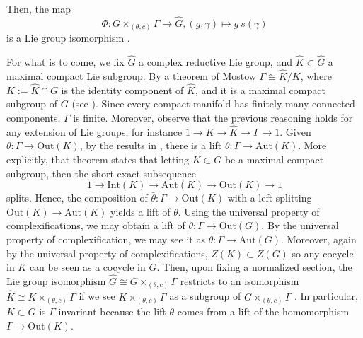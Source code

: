 Then, the map 
\begin{equation} \label{eq_def_isomorp}
\Phi\colon G \times_{(\theta, c)} \Gamma \longrightarrow \hat{G}, (g, \gamma) \mapsto g\ s(\gamma) 
\end{equation}
is a Lie group isomorphism \parencite[Remark 18.1.8]{hilgert2011structure}. 


For what is to come, we fix \(\hat{G}\) a complex reductive Lie group, and \(\hat{K} \subset \hat{G}\) a maximal compact Lie subgroup. By a theorem of Mostow \(\Gamma\cong\hat{K}/K\), where \(K:=\hat{K} \cap G\) is the identity component of \(\hat{K}\), and it is a maximal compact subgroup of \(G\) (see \parencite[Th. 3.1]{mostow1955self}). Since every compact manifold has finitely many connected components, \(\Gamma\) is finite. Moreover, observe that the previous reasoning holds for any extension of Lie groups, for instance \(1 \to K \to \hat{K}\to \Gamma \to 1\). Given \(\bar{\theta}\colon \Gamma \to \mathrm{Out}(K)\), by the results in \parencite[See Ch I, Sec 2]{de1956groupes}, there is a lift \(\theta\colon \Gamma \to \mathrm{Aut}(K)\). More explicitly, that theorem states that letting \(K\subset G\) be a maximal compact subgroup, then the short exact subsequence
\[
1 \to \mathrm{Int}(K) \to \mathrm{Aut}(K) \to \mathrm{Out}(K) \to 1
\]
splits. Hence, the composition of \(\bar{\theta}\colon \Gamma \to \mathrm{Out}(K)\) with a left splitting \(\mathrm{Out}(K) \to \mathrm{Aut}(K)\) yields a lift of \(\theta\). Using the universal property of complexifications, we may obtain a lift of \(\bar\theta\colon \Gamma\to \mathrm{Out}(G)\). By the universal property of complexification, we may see it as \(\theta\colon \Gamma \to \mathrm{Aut}(G)\). Moreover, again by the universal property of complexifications, \(Z(K)\subset Z(G)\) so any cocycle in \(K\) can be seen as a cocycle in \(G\). Then, upon fixing a normalized section, the Lie group isomorphism \(\hat{G} \cong G \times_{(\theta, c)} \Gamma\) restricts to an isomorphism \(\hat{K}\cong K \times_{(\theta, c)}\Gamma\) if we see \(K \times_{(\theta, c)}\Gamma\) as a subgroup of \(G \times_{(\theta, c)}\Gamma\) \parencite[Prop. 2.2]{barajas2023non}. In particular, \(K \subset G\) is \(\Gamma\)-invariant because the lift \(\theta\) comes from a lift of the homomorphism \(\Gamma \to \mathrm{Out}(K)\).

